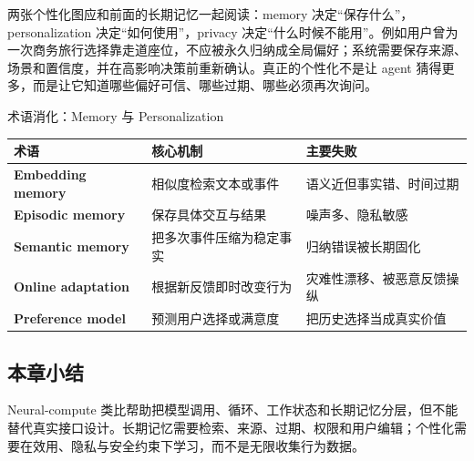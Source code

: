 

两张个性化图应和前面的长期记忆一起阅读：memory 决定“保存什么”，personalization 决定“如何使用”，privacy 决定“什么时候不能用”。例如用户曾为一次商务旅行选择靠走道座位，不应被永久归纳成全局偏好；系统需要保存来源、场景和置信度，并在高影响决策前重新确认。真正的个性化不是让 agent 猜得更多，而是让它知道哪些偏好可信、哪些过期、哪些必须再次询问。


\begin{knowledgebox}{术语消化：Memory 与 Personalization}
\begin{tabularx}{\textwidth}{>{\bfseries}p{} X X}
术语 & 核心机制 & 主要失败 \\
\hline
Embedding memory & 相似度检索文本或事件 & 语义近但事实错、时间过期 \\
Episodic memory & 保存具体交互与结果 & 噪声多、隐私敏感 \\
Semantic memory & 把多次事件压缩为稳定事实 & 归纳错误被长期固化 \\
Online adaptation & 根据新反馈即时改变行为 & 灾难性漂移、被恶意反馈操纵 \\
Preference model & 预测用户选择或满意度 & 把历史选择当成真实价值 \\
\end{tabularx}
\end{knowledgebox}

\subsection{本章小结}

Neural-compute 类比帮助把模型调用、循环、工作状态和长期记忆分层，但不能替代真实接口设计。长期记忆需要检索、来源、过期、权限和用户编辑；个性化需要在效用、隐私与安全约束下学习，而不是无限收集行为数据。

